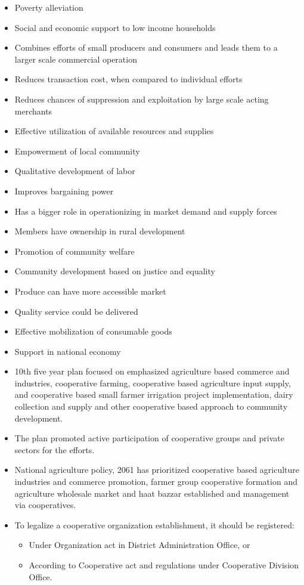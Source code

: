 \documentclass[
]{book}
\providecommand{\tightlist}{%
  \setlength{\itemsep}{0pt}\setlength{\parskip}{0pt}}
\begin{document}
\begin{itemize}
\item
  Poverty alleviation
\item
  Social and economic support to low income households
\item
  Combines efforts of small producers and consumers and leads them to a larger scale commercial operation
\item
  Reduces transaction cost, when compared to individual efforts
\item
  Reduces chances of suppression and exploitation by large scale acting merchants
\item
  Effective utilization of available resources and supplies
\item
  Empowerment of local community
\item
  Qualitative development of labor
\item
  Improves bargaining power
\item
  Has a bigger role in operationizing in market demand and supply forces
\item
  Members have ownership in rural development
\item
  Promotion of community welfare
\item
  Community development based on justice and equality
\item
  Produce can have more accessible market
\item
  Quality service could be delivered
\item
  Effective mobilization of consumable goods
\item
  Support in national economy
\item
  10th five year plan focused on emphasized agriculture based commerce and industries, cooperative farming, cooperative based agriculture input supply, and cooperative based small farmer irrigation project implementation, dairy collection and supply and other cooperative based approach to community development.
\item
  The plan promoted active participation of cooperative groups and private sectors for the efforts.
\item
  National agriculture policy, 2061 has prioritized cooperative based agriculture industries and commerce promotion, farmer group cooperative formation and agriculture wholesale market and haat bazzar established and management via cooperatives.
\item
  To legalize a cooperative organization establishment, it should be registered:

  \begin{itemize}
  \tightlist
  \item
    Under Organization act in District Administration Office, or
  \item
    According to Cooperative act and regulations under Cooperative Division Office.
  \end{itemize}
\end{itemize}
\end{document}
